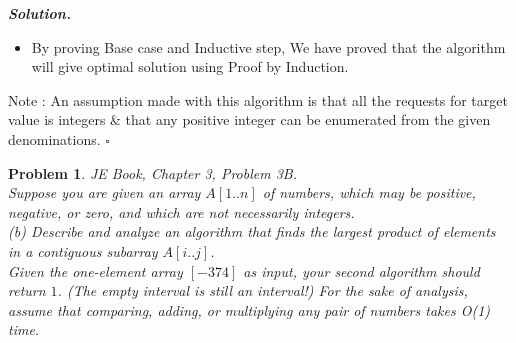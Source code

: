 \documentclass[12pt]{article}
\newtheorem{problem}{Problem}
\newenvironment{solution}[1][\it{Solution}]{\textbf{#1. } }{$\square$}
\begin{document}
\begin{solution}
\begin{itemize}
\begin{itemize}
        \item Since the inner while loops checks once with each possible denomination and since all of the $interimResult[1]$ to $interimResult[i-1]$ is optimal as per the assumption, $interimResult[i-*(denoms+k)]$ chosen during any of the iterations of while loop is also optimal. 
        \item Hence the optimal solution for the target value would be considered in one of the loop iterations. 
    \end{itemize}
    \item By proving Base case and Inductive step, We have proved that the algorithm will give optimal solution using Proof by Induction. 
\end{itemize}
Note : An assumption made with this algorithm is that all the requests for target value is integers \& that any positive integer can be enumerated from the given denominations. 
\end{solution} 

\hrulefill %

\begin{problem}
 JE Book, Chapter 3, Problem 3B. \\
 \indent Suppose you are given an array $A[1 .. n]$ of numbers, which may be positive, negative, or zero, and which are not necessarily integers.
\\ \indent (b) Describe and analyze an algorithm that finds the largest product of
elements in a contiguous subarray $A[i .. j]$.
\\ \indent  Given the one-element array $[-374]$ as input, your second algorithm should return $1$. (The empty interval is still an interval!) For the sake of analysis, assume that comparing, adding, or multiplying any pair of numbers takes O(1) time.
\end{problem}

\end{document}
